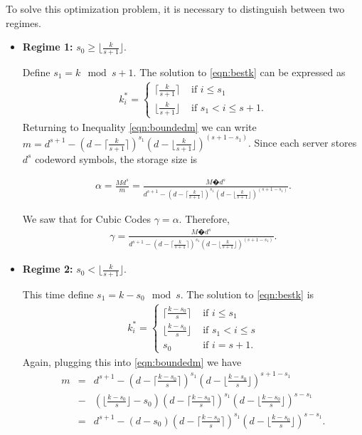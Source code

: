 \documentclass[journal,onecolumn,draftcls]{IEEEtran}
\begin{document}
To solve this optimization problem, it is necessary to distinguish between two regimes. 
\begin{itemize}
\item {\bf Regime 1:} $s_0 \ge  \lfloor{\frac{k}{s +1}}\rfloor$.

 Define $s_1 = k \mod s+1$. The solution to \eqref{eqn:bestk} can be expressed as
 \begin{eqnarray*}
k^*_{i}  = \begin{cases} 
\lceil{\frac{k}{s+1}}\rceil & \mbox{ if }   i\le s_1\\
\lfloor{\frac{k}{s+1}}\rfloor &  \mbox{ if }  s_1 < i\le s + 1.
\end{cases}
\end{eqnarray*}
Returning to Inequality \eqref{eqn:boundedm} we can write $m =  d^{s+1} -  (d - \lceil{\frac{k}{s+1}}\rceil)^{s_1} (d - \lfloor{\frac{k}{s+1}}\rfloor)^{(s +1- s_1)}$. Since each server stores $d^{s}$ codeword symbols, the storage size is 

\begin{eqnarray*}
\alpha = \frac{Md^s}{m} = \frac{M�d^{s}}{ d^{s+1} -  (d - \lceil{\frac{k}{s+1}}\rceil)^{s_1} (d - \lfloor{\frac{k}{s+1}}\rfloor)^{(s+1- s_1)}}.
\end{eqnarray*}

We saw that for Cubic Codes $\gamma = \alpha$. Therefore,
\begin{eqnarray*}
\gamma  =\frac{M�d^{s}}{ d^{s+1} -  (d - \lceil{\frac{k}{s+1}}\rceil)^{s_1} (d - \lfloor{\frac{k}{s+1}}\rfloor)^{(s +1- s_1)}}.
\end{eqnarray*}
\item {\bf Regime 2:} $s_0 <  \lfloor{\frac{k}{s +1}}\rfloor$.

This time define $s_1 = k-s_0\mod s$. The solution to \eqref{eqn:bestk} is 
\begin{eqnarray*}
k^*_{i}  = \begin{cases} 
\lceil{\frac{k-s_0}{s}}\rceil & \mbox{ if } i\le s_1\\
\lfloor{\frac{k-s_0}{s}}\rfloor &  \mbox{ if } s_1 < i\le s \\
s_0&  \mbox{ if }   i = s + 1.
\end{cases}
\end{eqnarray*}
Again, plugging this into \eqref{eqn:boundedm} we have
\begin{eqnarray*}
m &=& d^{s+1} -  (d - \lceil{\frac{k-s_0}{s}}\rceil)^{s_1}(d - \lfloor{\frac{k-s_0}{s}}\rfloor)^{s+1-s_1}\\&-& ( \lfloor{\frac{k-s_0}{s}}\rfloor - s_0)(d -\lceil{\frac{k-s_0}{s}}\rceil)^{s_1}(d -\lfloor{\frac{k-s_0}{s}}\rfloor)^{s-s_1}\\
&=&d^{s+1} -  (d-s_0)(d - \lceil{\frac{k-s_0}{s}}\rceil)^{s_1}(d - \lfloor{\frac{k-s_0}{s}}\rfloor)^{s-s_1}.
\end{eqnarray*}



\end{itemize}
\end{document}

